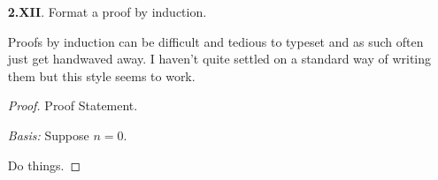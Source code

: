 \begin{enumerate}
        Cases are also very difficult to handle without using indentation via the addmargin command. They are the reason I began using the \textit{addmargin} environment.

        \textbf{Theorem.} Proof statement.
        \begin{proof}
          We can break the problem into cases.

          \textbf{Case 1:} ($x=0$)

          \begin{addmargin}{1cm}
            Suppose $x=0$.

            Do things.

            Thus $P$ is true.
          \end{addmargin}

          \textbf{Case 2:} ($x=1$)

          \begin{addmargin}{1cm}
            Suppose $x=1$.

            Do things.

            Thus $P$ is true.
          \end{addmargin}

          \textbf{Case 3:} ($x\neq 0$ and $x\neq 1$)

          \begin{addmargin}{1cm}
            Suppose $x\neq 0$ and $x\neq 1$.

            Do things.

            Thus $P$ is true.
          \end{addmargin}

          Since $P$ is true in each case then $P$ must always be true.
        \end{proof}

      \qspace

      \item[\textbf{2.XII}.]
        Format a proof by induction.

        \aspace

        Proofs by induction can be difficult and tedious to typeset and as such often just get handwaved away. I haven't quite settled on a standard way of writing them but this style seems to work.

        \begin{proof} Proof Statement.

        \textit{Basis:} Suppose $n=0$.

        Do things.


\end{proof}
\end{enumerate}
